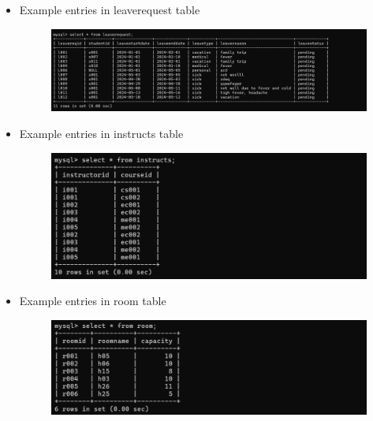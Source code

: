 \documentclass{article}
\begin{document}
\begin{itemize}
    \item \thispagestyle{empty}
    {\large{Example entries in leaverequest table}}
    \begin{figure}[H]
        \centering
        \includegraphics[width=1.1\textwidth, center]{7}
    \end{figure}

    \item \thispagestyle{empty}
    {\large{Example entries in instructs table}}
    \begin{figure}[H]
        \centering
        \includegraphics[width=1.1\textwidth, center]{8}
    \end{figure}
    
    \newpage

    \item \thispagestyle{empty}
    {\large{Example entries in room table}}
    \begin{figure}[H]
        \centering
        \includegraphics[width=1.1\textwidth, center]{9}
    \end{figure}


\end{itemize}
\end{document}
